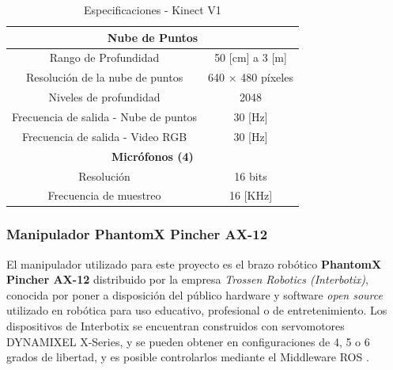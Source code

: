             \begin{table}
                \centering
                \begin{tabular}{|c|c|}
                \hline
                \multicolumn{2}{|c|}{\textbf{Nube de Puntos}} \\
                \hline
                    Rango de Profundidad & 50 [cm] a 3 [m]\\
                \hline
                    Resolución de la nube de puntos & 640 $\times$ 480 píxeles\\
                \hline
                     Niveles de profundidad & 2048\\
                \hline
                     Frecuencia de salida - Nube de puntos & 30 [Hz] \\
                \hline
                    Frecuencia de salida - Video RGB & 30 [Hz] \\
                \hline
                \multicolumn{2}{|c|}{\textbf{Micrófonos (4)}} \\
                \hline
                    Resolución  & 16 bits\\
                \hline
                    Frecuencia de muestreo & 16 [KHz]\\
                \hline
                
                \hline
                \end{tabular}
                \caption{Especificaciones - Kinect V1}
                \label{tab:my_label}
            \end{table}
                        
            
            \subsubsection{Manipulador PhantomX Pincher AX-12}
            El manipulador utilizado para este proyecto es el brazo robótico \textbf{PhantomX Pincher AX-12} distribuido por la empresa \textit{Trossen Robotics (Interbotix)}, conocida por poner a disposición del público hardware y software \textit{open source} utilizado en robótica para uso educativo, profesional o de entretenimiento. Los dispositivos de Interbotix se encuentran construidos con servomotores DYNAMIXEL X-Series, y se pueden obtener en configuraciones de 4, 5 o 6 grados de libertad, y es posible controlarlos mediante el Middleware ROS \cite{Interbotix_interbotix}. 
            
